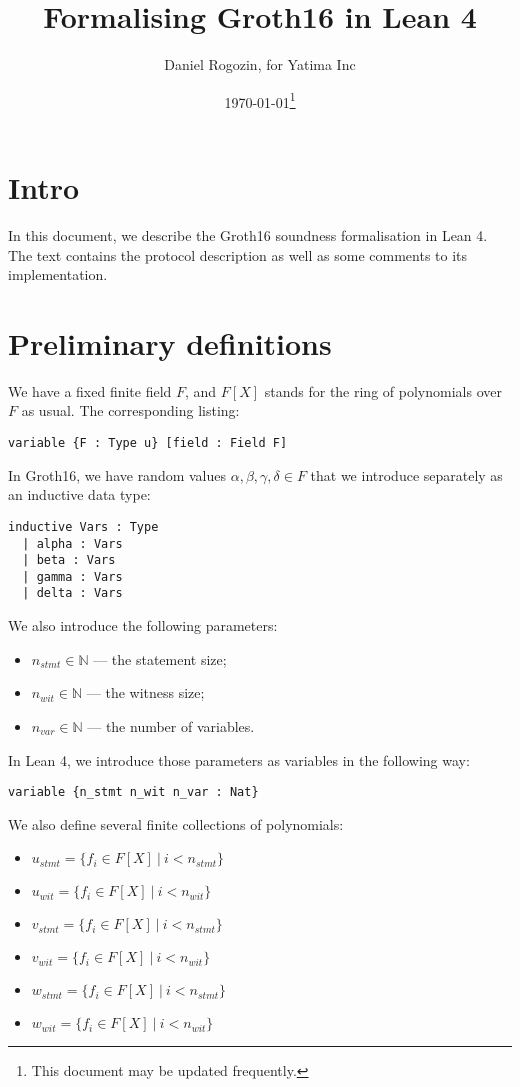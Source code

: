 \documentclass{article}
\title{Formalising Groth16 in Lean 4}
\author{Daniel Rogozin, for Yatima Inc}
\date{\today\footnote{This document may be updated frequently.}}
\theoremstyle{definition}
\theoremstyle{remark}
\begin{document}
\maketitle

\section{Intro}

In this document, we describe the Groth16 soundness formalisation in Lean 4.
The text contains the protocol description as well as some comments to its implementation.

\section{Preliminary definitions}

We have a fixed finite field $F$, and $F[X]$ stands for the ring of polynomials over $F$ as usual. The corresponding listing:

\begin{lstlisting}
variable {F : Type u} [field : Field F]
\end{lstlisting}

In Groth16, we have random values $\alpha, \beta, \gamma, \delta \in F$ that we introduce separately as an inductive data type:
\begin{lstlisting}
inductive Vars : Type
  | alpha : Vars
  | beta : Vars
  | gamma : Vars
  | delta : Vars
\end{lstlisting}

We also introduce the following parameters:

\begin{itemize}
\item $n_{stmt} \in \mathbb{N}$ --- the statement size;
\item $n_{wit} \in \mathbb{N}$ --- the witness size;
\item $n_{var} \in \mathbb{N}$ --- the number of variables.
\end{itemize}

In Lean 4, we introduce those parameters as variables in the following way:

\begin{lstlisting}
variable {n_stmt n_wit n_var : Nat}
\end{lstlisting}

We also define several finite collections of polynomials:

\begin{itemize}
\item $u_{stmt} = \{ f_{i} \in F[X] \: | \: i < n_{stmt} \}$
\item $u_{wit} = \{ f_{i} \in F[X] \: | \: i < n_{wit} \}$
\item $v_{stmt} = \{ f_{i} \in F[X] \: | \: i < n_{stmt} \}$
\item $v_{wit} = \{ f_{i} \in F[X] \: | \: i < n_{wit} \}$
\item $w_{stmt} = \{ f_{i} \in F[X] \: | \: i < n_{stmt} \}$
\item $w_{wit} = \{ f_{i} \in F[X] \: | \: i < n_{wit} \}$
\end{itemize}
\end{document}
